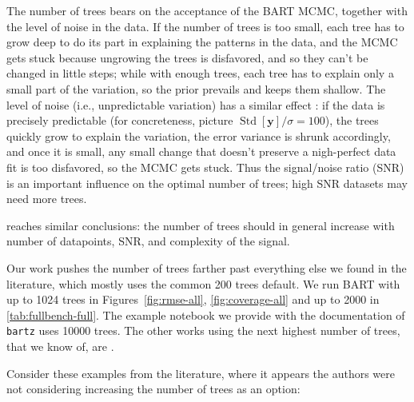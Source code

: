 \documentclass{article}
\begin{document}
The number of trees bears on the acceptance of the BART MCMC, together with the
level of noise in the data. If the number of trees is too small, each tree has
to grow deep to do its part in explaining the patterns in the data, and the MCMC
gets stuck because ungrowing the trees is disfavored, and so they can't be
changed in little steps; while with enough trees, each tree has to explain only
a small part of the variation, so the prior prevails and keeps them shallow. The
level of noise (i.e., unpredictable variation) has a similar effect
\citep{pratola2016}: if the data is precisely predictable (for concreteness,
picture $\operatorname{Std}[\mathbf y]/\sigma = 100$), the trees quickly grow to
explain the variation, the error variance is shrunk accordingly, and once it is
small, any small change that doesn't preserve a nigh-perfect data fit is too
disfavored, so the MCMC gets stuck. Thus the signal/noise ratio (SNR) is an
important influence on the optimal number of trees; high SNR datasets may need
more trees.

\textcite[pp.~61--64]{collins_improved_2023} reaches similar conclusions: the
number of trees should in general increase with number of datapoints, SNR, and
complexity of the signal.

Our work pushes the number of trees farther past everything else we found in
the literature, which mostly uses the common 200 trees default. We run BART with up to 1024 trees in
Figures~\ref{fig:rmse-all}, \ref{fig:coverage-all} and up to 2000 in
\autoref{tab:fullbench-full}. The example notebook we provide with the
documentation of \texttt{bartz} uses \num{10000} trees.
The other works using the next highest number of trees, that we know of,
are \textcites
[][\S5.3, p.~289, 800 trees]{chipman2010}
[][\S7.3, p.~849, 500 trees]{pratola2014}
[][Fig.~3.4, p.~57, 800 trees]{collins_improved_2023}
[][Fig.~6, p.~26, 500 trees]{tan2026computationalefficiencybayesianadditive}.

Consider these examples from the literature, where it appears the
authors were not considering increasing the number of trees as an option:
\end{document}

